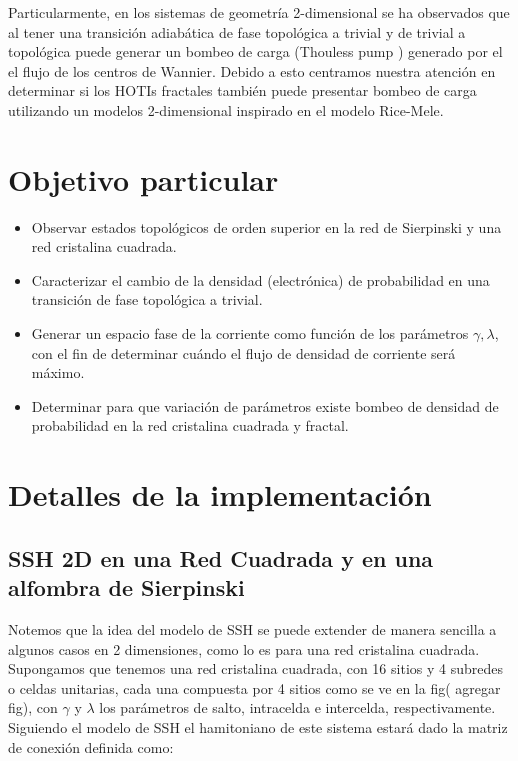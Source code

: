 Particularmente, en los sistemas de geometría 2-dimensional se ha observados que al tener una transición adiabática de fase topológica a trivial y de trivial a topológica puede generar un bombeo de carga (Thouless pump \cite{benalcazar2020higher}) generado por el el flujo de los centros de Wannier. Debido a esto centramos nuestra atención en determinar si los HOTIs fractales también puede presentar bombeo de carga utilizando un modelos 2-dimensional inspirado en el modelo Rice-Mele.
    
    \section{Objetivo particular}
    \begin{itemize}
        \item Observar estados topológicos de orden superior en la red de Sierpinski y una red cristalina cuadrada.
        \item Caracterizar el cambio de la densidad (electrónica) de probabilidad en una transición de fase topológica a trivial. 
        \item Generar un espacio fase de la corriente como función de los parámetros $\gamma, \lambda$, con el fin de determinar cuándo el flujo de densidad de corriente será máximo.
        \item Determinar para que variación de parámetros existe bombeo de densidad de probabilidad en la red cristalina cuadrada y fractal.
    \end{itemize}
    
\section{Detalles de la implementación}
    

\subsection{SSH 2D en una Red Cuadrada y en una alfombra de Sierpinski}\label{Modelo_SSH_squara_and_Fractal}

    Notemos que la idea del modelo de SSH se puede extender de manera sencilla a algunos casos en 2 dimensiones, como lo es para una red cristalina cuadrada. Supongamos que tenemos una red cristalina cuadrada, con 16 sitios y 4 subredes o celdas unitarias, cada una compuesta por 4 sitios como se ve en la fig( agregar fig), con $\gamma$ y $\lambda$ los parámetros de salto, intracelda e intercelda, respectivamente. Siguiendo el modelo de SSH el hamitoniano de este sistema estará dado la matriz de conexión definida como: 
    
